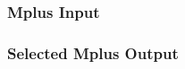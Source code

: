 \subsubsection{Mplus Input}

\begin{MAEcode}
    
\end{MAEcode}

\subsubsection{Selected Mplus Output}\label{sec:rsq}

\begin{MAEcode}
    
\end{MAEcode}
